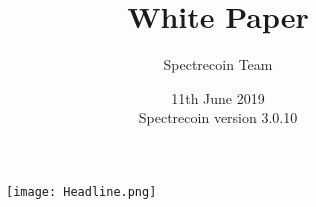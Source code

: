\author{Spectrecoin Team}
\title{White Paper}
\date{11th June 2019\\
	Spectrecoin version 3.0.10}

\maketitle

\begin{figure}[h]
	\centering
	\texttt{[image: Headline.png]}
\end{figure}